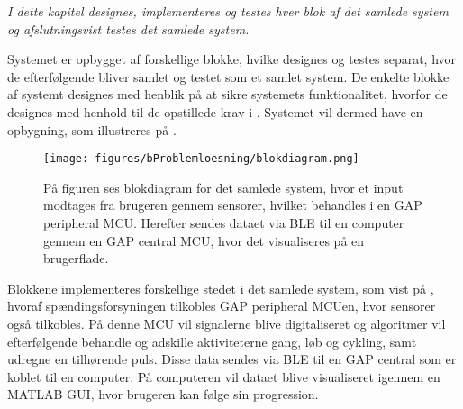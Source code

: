 \textit{I dette kapitel designes, implementeres og testes hver blok af det samlede system og afslutningsvist testes det samlede system.}

Systemet er opbygget af forskellige blokke, hvilke designes og testes separat, hvor de efterfølgende bliver samlet og testet som et samlet system. De enkelte blokke af systemt designes med henblik på at sikre systemets funktionalitet, hvorfor de designes  med henhold til de opstillede krav i . Systemet vil dermed have en opbygning, som illustreres på .

\begin{figure}[H]
	\centering
	\texttt{[image: figures/bProblemloesning/blokdiagram.png]}
	\caption{På figuren ses blokdiagram for det samlede system, hvor et input modtages fra brugeren gennem sensorer, hvilket behandles i en GAP peripheral MCU. Herefter sendes dataet via BLE til en computer gennem en GAP central MCU, hvor det visualiseres på en brugerflade.}
	\label{fig:design_blokdiagram}
\end{figure}

Blokkene implementeres forskellige stedet i det samlede system, som vist på , hvoraf spændingsforsyningen tilkobles GAP peripheral MCUen, hvor sensorer også tilkobles. På denne MCU vil signalerne blive digitaliseret og algoritmer vil efterfølgende behandle og adskille aktiviteterne gang, løb og cykling, samt udregne en tilhørende puls. Disse data sendes via BLE til en GAP central som er koblet til en computer. På computeren vil dataet blive visualiseret igennem en MATLAB GUI, hvor brugeren kan følge sin progression.  